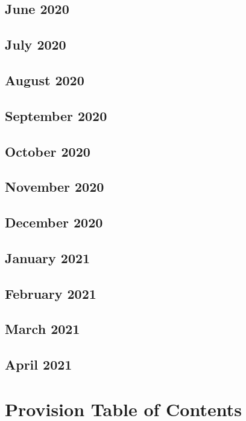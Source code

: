\documentclass{article}
\begin{document}
	\subsection{June 2020}
	
	\subsection{July 2020}
	
	\subsection{August 2020}
	
	\subsection{September 2020}
	
	\subsection{October 2020}
	
	\subsection{November 2020}
	
	\subsection{December 2020}
	
	\subsection{January 2021}
	
	\subsection{February 2021}
	
	\subsection{March 2021}
	
	\subsection{April 2021}
	\section{Provision Table of Contents}
\end{document}
